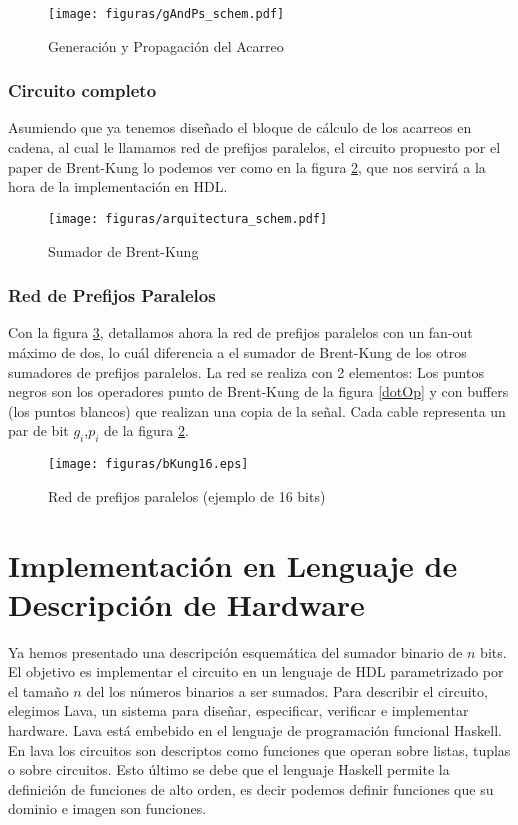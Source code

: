 
\begin{figure}[h!]
  \centering
\texttt{[image: figuras/gAndPs\_schem.pdf]}
  \caption{Generación y Propagación del Acarreo}
  \label{gAndPs}
\end{figure}

\subsubsection {Circuito completo}
Asumiendo que ya tenemos diseñado el bloque de cálculo de los acarreos en cadena, al cual le llamamos red de prefijos paralelos, el circuito propuesto por el paper de Brent-Kung\cite{brent-kung} lo podemos ver como en la figura \ref{bkungadder}, que nos servirá a la hora de la implementación en HDL.

\begin{figure}[h]
  \centering
\texttt{[image: figuras/arquitectura\_schem.pdf]}
  \caption{Sumador de Brent-Kung}
  \label{bkungadder}
\end{figure}

\subsubsection {Red de Prefijos Paralelos}
\noindent Con la figura \ref{bKung16}, detallamos ahora la red de prefijos paralelos con un fan-out máximo de dos, lo cuál diferencia a el sumador de Brent-Kung de los otros sumadores de prefijos paralelos. La red se realiza con 2 elementos: Los puntos negros son los operadores punto de Brent-Kung de la figura \ref{dotOp} y con buffers (los puntos blancos) que realizan una copia de la señal. Cada cable representa un par de bit \(g_i\),\(p_i\) de la figura \ref{bkungadder}.


\begin{figure}[h!]
\vspace{-5pt}
  \centering
\texttt{[image: figuras/bKung16.eps]}
  \caption{Red de prefijos paralelos (ejemplo de 16 bits)}
\label{bKung16}
\vspace{-10pt}
\end{figure}

\section{Implementación en Lenguaje de Descripción de Hardware}
Ya hemos presentado una descripción esquemática del sumador binario de \(n\) bits. El objetivo es implementar el circuito en un lenguaje de HDL parametrizado por el tamaño \(n\) del los números binarios a ser sumados. Para describir el circuito, elegimos Lava, un sistema para diseñar, especificar, verificar e implementar hardware. Lava está embebido en el lenguaje de programación funcional Haskell. En lava los circuitos son descriptos como funciones que operan sobre listas, tuplas o sobre circuitos. Esto último se debe que el lenguaje Haskell permite la definición de funciones de alto orden, es decir podemos definir funciones que su dominio e imagen son funciones. 

